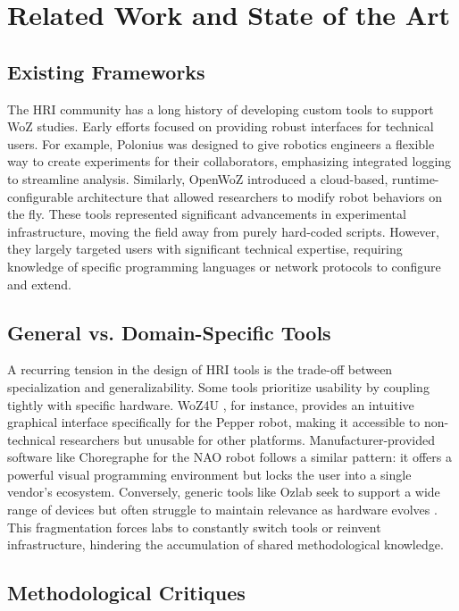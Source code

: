 \chapter{Related Work and State of the Art}
\label{ch:related_work}

\section{Existing Frameworks}

The HRI community has a long history of developing custom tools to support WoZ studies. Early efforts focused on providing robust interfaces for technical users. For example, Polonius \cite{Lu2011} was designed to give robotics engineers a flexible way to create experiments for their collaborators, emphasizing integrated logging to streamline analysis. Similarly, OpenWoZ \cite{Hoffman2016} introduced a cloud-based, runtime-configurable architecture that allowed researchers to modify robot behaviors on the fly. These tools represented significant advancements in experimental infrastructure, moving the field away from purely hard-coded scripts. However, they largely targeted users with significant technical expertise, requiring knowledge of specific programming languages or network protocols to configure and extend.

\section{General vs. Domain-Specific Tools}

A recurring tension in the design of HRI tools is the trade-off between specialization and generalizability. Some tools prioritize usability by coupling tightly with specific hardware. WoZ4U \cite{Rietz2021}, for instance, provides an intuitive graphical interface specifically for the Pepper robot, making it accessible to non-technical researchers but unusable for other platforms. Manufacturer-provided software like Choregraphe \cite{Pot2009} for the NAO robot follows a similar pattern: it offers a powerful visual programming environment but locks the user into a single vendor's ecosystem. Conversely, generic tools like Ozlab seek to support a wide range of devices but often struggle to maintain relevance as hardware evolves \cite{Pettersson2015}. This fragmentation forces labs to constantly switch tools or reinvent infrastructure, hindering the accumulation of shared methodological knowledge.

\section{Methodological Critiques}

